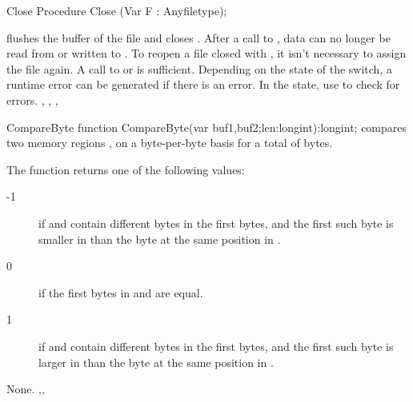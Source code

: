 
\begin{procedure}{Close}
\Declaration
Procedure Close (Var F : Anyfiletype);

\Description
{} flushes the buffer of the file  and closes .
After a call to , data can no longer be read from or written to
.
To reopen a file closed with , it isn't necessary to assign the
file again. A call to  or  is sufficient.
\Errors
Depending on the state of the  switch, a runtime error can be 
generated if there is an error. In the  state, use 
to check for errors.
\SeeAlso
{}, , , 
\end{procedure}


\begin{function}{CompareByte}
\Declaration
function CompareByte(var buf1,buf2;len:longint):longint;
\Description
{} compares two memory regions , on a
byte-per-byte basis for a total of  bytes.

The function returns one of the following values:
\begin{description}
\item[-1] if  and  contain different bytes
in the first  bytes, and the first such byte is smaller in 
than the byte at the same position in .
\item[0]  if the first  bytes in  and  are
equal.
\item [1] if  and  contain different bytes
in the first  bytes, and the first such byte is larger in 
than the byte at the same position in .
\end{description}
\Errors
None.
\SeeAlso
{},,
\end{function}


